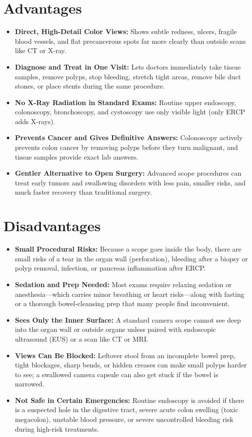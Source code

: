 \section{Advantages}
\begin{itemize}
\item \textbf{Direct, High-Detail Color Views:} Shows subtle redness, ulcers, fragile blood vessels, and flat precancerous spots far more clearly than outside scans like CT or X-ray.
\item \textbf{Diagnose and Treat in One Visit:} Lets doctors immediately take tissue samples, remove polyps, stop bleeding, stretch tight areas, remove bile duct stones, or place stents during the same procedure.
\item \textbf{No X-Ray Radiation in Standard Exams:} Routine upper endoscopy, colonoscopy, bronchoscopy, and cystoscopy use only visible light (only ERCP adds X-rays).
\item \textbf{Prevents Cancer and Gives Definitive Answers:} Colonoscopy actively prevents colon cancer by removing polyps before they turn malignant, and tissue samples provide exact lab answers.
\item \textbf{Gentler Alternative to Open Surgery:} Advanced scope procedures can treat early tumors and swallowing disorders with less pain, smaller risks, and much faster recovery than traditional surgery.
\end{itemize}


\section{Disadvantages}
\begin{itemize}
\item \textbf{Small Procedural Risks:} Because a scope goes inside the body, there are small risks of a tear in the organ wall (perforation), bleeding after a biopsy or polyp removal, infection, or pancreas inflammation after ERCP.
\item \textbf{Sedation and Prep Needed:} Most exams require relaxing sedation or anesthesia---which carries minor breathing or heart risks---along with fasting or a thorough bowel-cleansing prep that many people find inconvenient.
\item \textbf{Sees Only the Inner Surface:} A standard camera scope cannot see deep into the organ wall or outside organs unless paired with endoscopic ultrasound (EUS) or a scan like CT or MRI.
\item \textbf{Views Can Be Blocked:} Leftover stool from an incomplete bowel prep, tight blockages, sharp bends, or hidden creases can make small polyps harder to see; a swallowed camera capsule can also get stuck if the bowel is narrowed.
\item \textbf{Not Safe in Certain Emergencies:} Routine endoscopy is avoided if there is a suspected hole in the digestive tract, severe acute colon swelling (toxic megacolon), unstable blood pressure, or severe uncontrolled bleeding risk during high-risk treatments.
\end{itemize}


